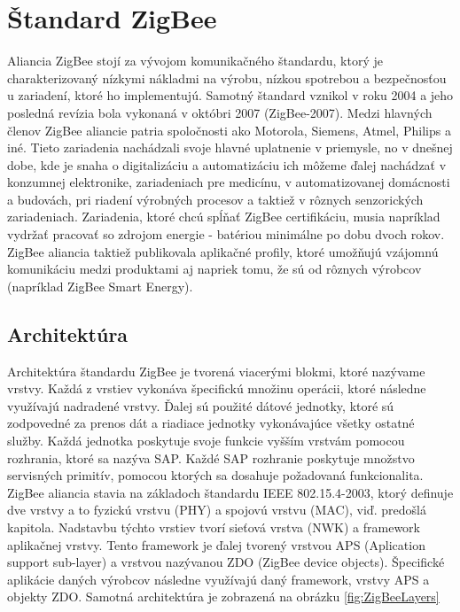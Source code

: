 \documentclass[11pt,twoside,a4paper]{book}
\begin{document}
\chapter{Štandard ZigBee}
Aliancia ZigBee stojí za vývojom komunikačného štandardu, ktorý je charakterizovaný nízkymi nákladmi na výrobu, nízkou spotrebou a bezpečnosťou u zariadení, ktoré ho implementujú. Samotný štandard vznikol v roku 2004 a jeho posledná revízia bola vykonaná v októbri 2007 (ZigBee-2007). Medzi hlavných členov ZigBee aliancie patria spoločnosti ako Motorola, Siemens, Atmel, Philips a iné. Tieto zariadenia nachádzali svoje hlavné uplatnenie v priemysle, no v dnešnej dobe, kde je snaha o digitalizáciu a automatizáciu ich môžeme ďalej nachádzať v konzumnej elektronike, zariadeniach pre medicínu, v automatizovanej domácnosti a budovách, pri riadení výrobných procesov a taktiež v rôznych senzorických zariadeniach. Zariadenia, ktoré chcú spĺňať ZigBee certifikáciu, musia napríklad vydržať pracovať so zdrojom energie - batériou minimálne po dobu dvoch rokov. ZigBee aliancia taktiež publikovala aplikačné profily, ktoré umožňujú vzájomnú komunikáciu medzi produktami aj napriek tomu, že sú od rôznych výrobcov (napríklad ZigBee Smart Energy).

\section{Architektúra}
Architektúra štandardu ZigBee je tvorená viacerými blokmi, ktoré nazývame vrstvy. Každá z vrstiev vykonáva špecifickú množinu operácii, ktoré následne využívajú nadradené vrstvy. Ďalej sú použité dátové jednotky, ktoré sú zodpovedné za prenos dát a riadiace jednotky vykonávajúce všetky ostatné služby. Každá jednotka poskytuje svoje funkcie vyšším vrstvám pomocou rozhrania, ktoré sa nazýva SAP. Každé SAP rozhranie poskytuje množstvo servisných primitív, pomocou ktorých sa dosahuje požadovaná funkcionalita.
ZigBee aliancia stavia na základoch štandardu IEEE 802.15.4-2003, ktorý definuje dve vrstvy a to fyzickú vrstvu (PHY) a spojovú vrstvu (MAC), viď. predošlá kapitola. Nadstavbu týchto vrstiev tvorí sieťová vrstva (NWK) a framework aplikačnej vrstvy. Tento framework je ďalej tvorený vrstvou APS (Aplication support sub-layer) a vrstvou nazývanou ZDO (ZigBee device objects). Špecifické aplikácie daných výrobcov následne využívajú daný framework, vrstvy APS a objekty ZDO. Samotná architektúra je zobrazená na obrázku \ref{fig:ZigBeeLayers}
\end{document}

